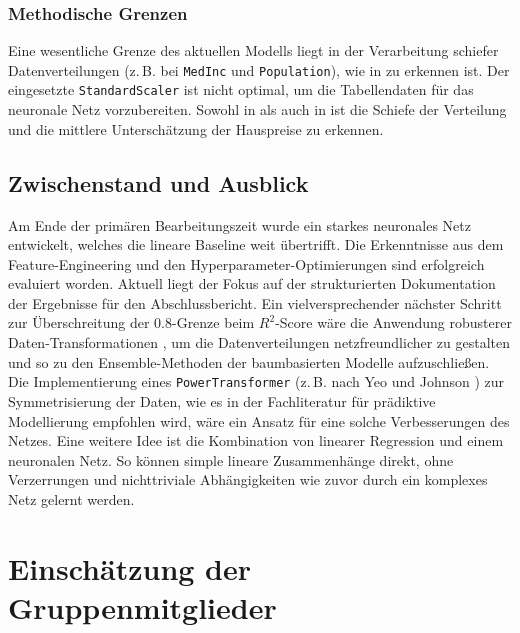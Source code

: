 \documentclass[9pt,a4paper,twocolumn,twoside]{tau-class/tau}
\begin{document}
\subsubsection{Methodische Grenzen}
Eine wesentliche Grenze des aktuellen Modells liegt in der Verarbeitung schiefer Datenverteilungen (z.\,B. bei \texttt{MedInc} und \texttt{Population}), wie in  
zu erkennen ist.
Der eingesetzte \texttt{StandardScaler} ist nicht optimal, um die Tabellendaten für das neuronale Netz vorzubereiten. 
Sowohl in  als auch in  ist die Schiefe der Verteilung und die mittlere Unterschätzung 
der Hauspreise zu erkennen.
\subsection{Zwischenstand und Ausblick}

Am Ende der primären Bearbeitungszeit wurde ein starkes neuronales Netz entwickelt, welches die lineare Baseline weit übertrifft.
Die Erkenntnisse aus dem Feature-Engineering und den Hyperparameter-Optimierungen sind erfolgreich evaluiert worden.
Aktuell liegt der Fokus auf der strukturierten Dokumentation der Ergebnisse für den Abschlussbericht.
Ein vielversprechender nächster Schritt zur Überschreitung der 0{.}8-Grenze beim $R^2$-Score wäre die Anwendung robusterer Daten-Transformationen \cite{yeo2000power},
 um die Datenverteilungen netzfreundlicher zu gestalten und so zu den Ensemble-Methoden der baumbasierten Modelle aufzuschließen.
Die Implementierung eines \texttt{PowerTransformer} (z.\,B. nach Yeo und Johnson \cite{yeo2000power}) zur Symmetrisierung der Daten,
wie es in der Fachliteratur für prädiktive Modellierung \cite{kuhn2013applied} empfohlen wird, wäre ein Ansatz für eine solche Verbesserungen des Netzes.
Eine weitere Idee ist die Kombination von linearer Regression und einem neuronalen Netz. So können simple lineare Zusammenhänge direkt, 
ohne Verzerrungen und nichttriviale Abhängigkeiten wie zuvor durch ein komplexes Netz gelernt werden.





\newpage 
\section{Einschätzung der Gruppenmitglieder}
\end{document}
